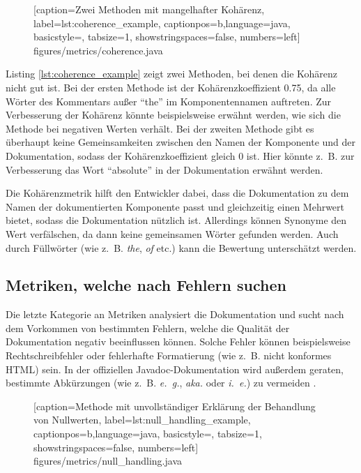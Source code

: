 	\begin{figure}[ht!]
			
			[caption={Zwei Methoden mit mangelhafter Kohärenz},
			label={lst:coherence_example},
			captionpos=b,language=java, basicstyle=\footnotesize, tabsize=1, showstringspaces=false,  numbers=left]
			{figures/metrics/coherence.java}
	\end{figure}
		
 Listing \ref{lst:coherence_example} zeigt zwei Methoden, bei denen die Kohärenz nicht gut ist. Bei der ersten Methode ist der Kohärenzkoeffizient 0.75, da alle Wörter des Kommentars außer \enquote{the} im Komponentennamen auftreten. Zur Verbesserung der Kohärenz könnte beispielsweise erwähnt werden, wie sich die Methode bei negativen Werten verhält. Bei der zweiten Methode gibt es überhaupt keine Gemeinsamkeiten zwischen den Namen der Komponente und der Dokumentation, sodass der Kohärenzkoeffizient gleich 0 ist. Hier könnte z.~B. zur Verbesserung  das Wort \enquote{absolute} in der Dokumentation erwähnt werden.

Die Kohärenzmetrik hilft den Entwickler dabei, dass die Dokumentation zu dem Namen der dokumentierten Komponente passt und gleichzeitig einen Mehrwert bietet, sodass die Dokumentation nützlich ist. Allerdings können Synonyme den Wert verfälschen, da dann keine gemeinsamen Wörter gefunden werden. Auch durch Füllwörter (wie z.~B. \textit{the}, \textit{of} etc.) kann die Bewertung unterschätzt werden.

\subsection{Metriken, welche  nach Fehlern suchen}\label{chapter:metrics_errors}

Die letzte Kategorie an Metriken analysiert die Dokumentation und sucht nach dem Vorkommen von bestimmten Fehlern, welche die Qualität der Dokumentation negativ beeinflussen können. Solche Fehler können beispielsweise Rechtschreibfehler oder fehlerhafte Formatierung (wie z.~B. nicht konformes \ac{HTML}) sein. In der offiziellen Javadoc-Dokumentation wird außerdem geraten, bestimmte Abkürzungen (wie z.~B. \textit{e.~g.}, \textit{aka.} oder \textit{i.~e.}) zu vermeiden \cite{HowtoWriteDocCommentsfortheJavadocTool}. 

		\begin{figure}[ht!]
			
			[caption={Methode mit unvollständiger Erklärung der Behandlung von Nullwerten},
			label={lst:null_handling_example},
			captionpos=b,language=java, basicstyle=\footnotesize, tabsize=1, showstringspaces=false,  numbers=left]
			{figures/metrics/null_handling.java}
		\end{figure}
		
